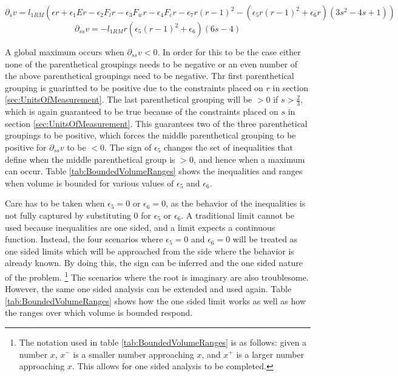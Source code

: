 \begin{equation*}
    \partial_s v = l_{1RM} \left(
			\epsilon r+
			\epsilon_1 Er-
			\epsilon_2 F_l r-
			\epsilon_3 F_w r-
			\epsilon_4 F_e r-
			\epsilon_7 r(r-1)^2	-
			\left( 
				\epsilon_5 r(r-1)^2+\epsilon_6 r
			\right)
			(3s^2-4s+1)
		\right)
\end{equation*}
\begin{equation*}
    \partial_{ss}v=-l_{1RM} r
    		\left( 
			\epsilon_5 (r-1)^2+\epsilon_6
		\right)
		(6s-4)
\end{equation*}

A global maximum occurs when $\partial_{ss} v<0$. In order for this to be the case either none of the parenthetical groupings needs to be negative or an even number of the above parenthetical groupings need to be negative. Thr first parenthetical grouping is guarintted to be positive due to the constraints placed on $r$ in section \ref{sec:UnitsOfMeasurement}. The last parenthetical grouping will be $>0$ if $s>\frac{2}{3}$, which is again guaranteed to be true because of the constraints placed on $s$ in section \ref{sec:UnitsOfMeasurement}. This guarantees two of the three parenthetical groupings to be positive, which forces the middle parenthetical grouping to be positive for $\partial_{ss} v$ to be $<0$. The sign of $\epsilon_5$ changes the set of inequalities that define when the middle parenthetical group is $>0$, and hence when a maximum can occur. Table \ref{tab:BoundedVolumeRanges} shows the inequalities and ranges when volume is bounded for various values of $\epsilon_5$ and $\epsilon_6$.

Care has to be taken when $\epsilon_5=0$ or $\epsilon_6=0$, as the behavior of the inequalities is not fully captured by substituting $0$ for $\epsilon_5$ or $\epsilon_6$. A traditional limit cannot be used because inequalities are one sided, and a limit expects a continuous function. Instead, the four scenarios where $\epsilon_5=0$ and $\epsilon_6=0$ will be treated as one sided limits which will be approached from the side where the behavior is already known. By doing this, the sign can be inferred and the one sided nature of the problem. \footnote{The notation used in table \ref{tab:BoundedVolumeRanges} is as follows: given a number $x$, $x^-$ is a smaller number approaching $x$, and $x^+$ is a larger number approaching $x$. This allows for one sided analysis to be completed.} The scenarios where the root is imaginary are also troublesome. However, the same one sided analysis can be extended and used again. Table \ref{tab:BoundedVolumeRanges} shows how the one sided limit works as well as how the ranges over which volume is bounded respond.


